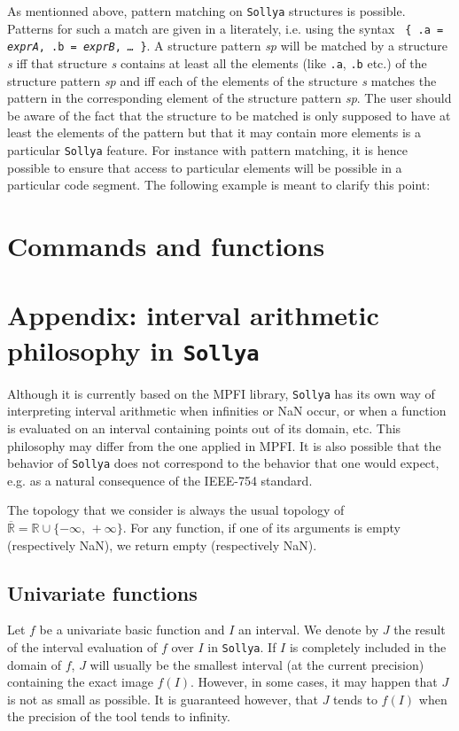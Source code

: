 \documentclass[a4paper]{article}
\newcommand{\key}[1]{\texttt{#1}}
\newcommand{\sollya}{\texttt{Sollya}\xspace}
\begin{document}


As mentionned above, pattern matching on \sollya structures is
possible. Patterns for such a match are given in a literately,
i.e. using the syntax \key{ \{ .a = {\it exprA}, .b = {\it exprB},
  {\it \dots}~\}}. A structure pattern {\it sp} will be matched by a
structure {\it s} iff that structure {\it s} contains at least all the
elements (like \key{.a}, \key{.b} etc.) of the structure pattern {\it
  sp} and iff each of the elements of the structure {\it s} matches
the pattern in the corresponding element of the structure pattern {\it
  sp}. The user should be aware of the fact that the structure to be
matched is only supposed to have at least the elements of the pattern
but that it may contain more elements is a particular \sollya
feature. For instance with pattern matching, it is hence possible to
ensure that access to particular elements will be possible in a
particular code segment. The following example is meant to clarify
this point:



\section{Commands and functions}
\label{commandsAndFunctions}


\newpage
\section{Appendix: interval arithmetic philosophy in \sollya}
\label{IntervalArithmeticPhilopshy}

Although it is currently based on the MPFI library, \sollya has its own way of interpreting interval arithmetic when infinities or NaN occur, or when a function is evaluated on an interval containing points out of its domain, etc. This philosophy may differ from the one applied in MPFI. It is also possible that the behavior of \sollya does not correspond to the behavior that one would expect, e.g. as a natural consequence of the IEEE-754 standard.

The topology that we consider is always the usual topology of $\overline{\mathbb{R}} = \mathbb{R} \cup \{-\infty,\,+\infty\}$. For any function, if one of its arguments is empty (respectively NaN), we return empty (respectively NaN).

\subsection{Univariate functions}
Let $f$ be a univariate basic function and $I$ an interval. We denote by $J$ the result of the interval evaluation of $f$ over $I$ in \sollya. If $I$ is completely included in the domain of $f$, $J$ will usually be the smallest interval (at the current precision) containing the exact image $f(I)$. However, in some cases, it may happen that $J$ is not as small as possible. It is guaranteed however, that $J$ tends to $f(I)$ when the precision of the tool tends to infinity.
\end{document}
